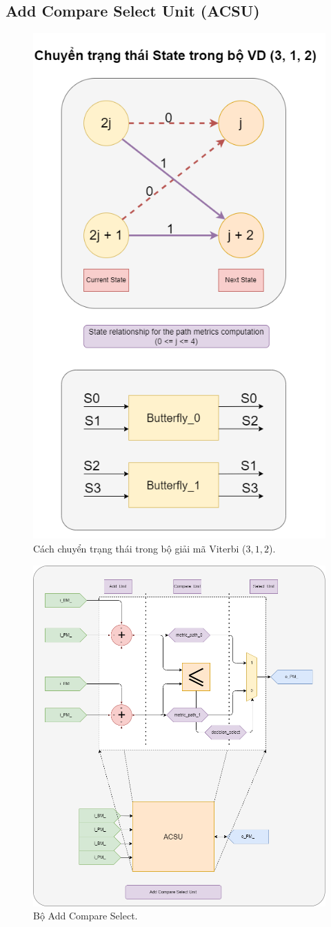 \subsection{Add Compare Select Unit (ACSU)}

\begin{figure}[H]
	\centering
	\includegraphics[width=.6\linewidth]{sections/pic/mophongbangSystemVerilog/ACSU_proc_state.png}
	\caption{Cách chuyển trạng thái trong bộ giải mã Viterbi ($3, 1, 2$).}
\end{figure}

\begin{figure}[H]
	\centering
	\includegraphics[width=.8\linewidth]{sections/pic/mophongbangSystemVerilog/ACS.png}
	\caption{Bộ Add Compare Select.}
\end{figure}

